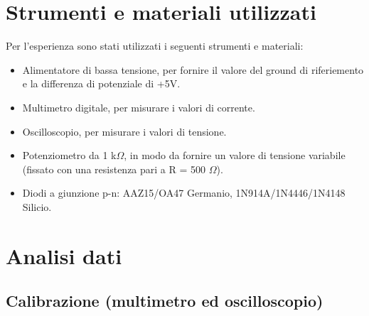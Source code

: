\documentclass[a4paper, 11pt]{article}
\begin{document}
\newpage
\section{Strumenti e materiali utilizzati}
Per l'esperienza sono stati utilizzati i seguenti strumenti e materiali:
\begin{itemize}
    \item Alimentatore di bassa tensione, per fornire il valore del ground di riferiemento e la differenza di potenziale di +5V.
    \item Multimetro digitale, per misurare i valori di corrente.
    \item Oscilloscopio, per misurare i valori di tensione.
    \item Potenziometro da 1 k$\Omega$, in modo da fornire un valore di tensione variabile (fissato con una resistenza pari a R = 500 $\Omega$).
    \item Diodi a giunzione p-n: AAZ15/OA47 Germanio, 1N914A/1N4446/1N4148 Silicio. 
\end{itemize}

\section{Analisi dati}

\subsection{Calibrazione (multimetro ed oscilloscopio)}
\end{document}
